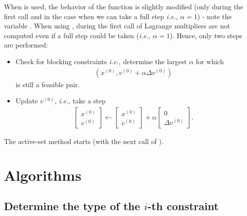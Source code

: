 \documentclass[12pt,a4paper]{article}
\begin{document}
When  is used, the behavior of the function  is
slightly modified (only during the first call and in the case when we can take a full step
\emph{i.e.,} $\alpha = 1$) - note the variable . When using
, during the first call of  Lagrange multipliers are
not computed even if a full step could be taken (\emph{i.e.,} $\alpha = 1$). Hence, only two steps
are performed:
%
\begin{itemize}
\item Check for blocking constraints \emph{i.e.,} determine the largest $\alpha$ for which
  \begin{align*}
  (x^{(0)}, v^{(0)} + \alpha \Delta v^{(0)})
  \end{align*}
  is still a feasible pair.

\item Update $v^{(0)}$, \emph{i.e.,} take a step
  \begin{align*}
    \begin{bmatrix} x^{(0)} \\ v^{(0)} \end{bmatrix} \leftarrow 
    \begin{bmatrix} x^{(0)} \\ v^{(0)} \end{bmatrix} +
    \alpha\begin{bmatrix} 0 \\ \Delta v^{(0)} \end{bmatrix}.
  \end{align*}
\end{itemize}
%
The active-set method starts (with the next call of ).

\clearpage

\section{Algorithms}

\subsection{Determine the type of the $i$-th constraint}
\end{document}
